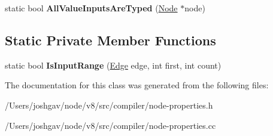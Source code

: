 \begin{DoxyCompactItemize}
\item 
static bool {\bfseries All\+Value\+Inputs\+Are\+Typed} (\hyperlink{classv8_1_1internal_1_1compiler_1_1_node}{Node} $\ast$node)\hypertarget{classv8_1_1internal_1_1compiler_1_1_node_properties_a95b58358bec4272ff0a030ada811a845}{}\label{classv8_1_1internal_1_1compiler_1_1_node_properties_a95b58358bec4272ff0a030ada811a845}

\end{DoxyCompactItemize}
\subsection*{Static Private Member Functions}
\begin{DoxyCompactItemize}
\item 
static bool {\bfseries Is\+Input\+Range} (\hyperlink{classv8_1_1internal_1_1compiler_1_1_edge}{Edge} edge, int first, int count)\hypertarget{classv8_1_1internal_1_1compiler_1_1_node_properties_a1168b0162125a06874df4bd89c2a4b6d}{}\label{classv8_1_1internal_1_1compiler_1_1_node_properties_a1168b0162125a06874df4bd89c2a4b6d}

\end{DoxyCompactItemize}


The documentation for this class was generated from the following files\+:\begin{DoxyCompactItemize}
\item 
/\+Users/joshgav/node/v8/src/compiler/node-\/properties.\+h\item 
/\+Users/joshgav/node/v8/src/compiler/node-\/properties.\+cc\end{DoxyCompactItemize}
